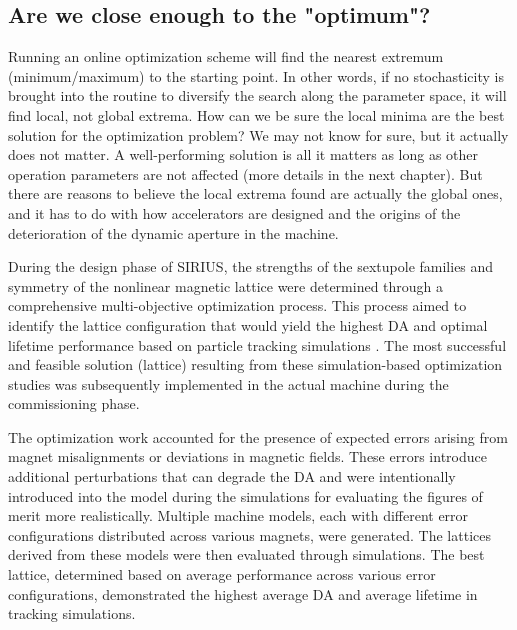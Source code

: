 \subsection{Are we close enough to the "optimum"?}
Running an online optimization scheme will find the nearest extremum (minimum/maximum) to the starting point. In other words, if no stochasticity is brought into the routine to diversify the search along the parameter space, it will find local, not global extrema. How can we be sure the local minima are the best solution for the optimization problem? We may not know for sure, but it actually does not matter. A well-performing solution is all it matters as long as other operation parameters are not affected (more details in the next chapter). But there are reasons to believe the local extrema found are actually the global ones, and it has to do with how accelerators are designed and the origins of the deterioration of the dynamic aperture in the machine.

During the design phase of SIRIUS, the strengths of the sextupole families and symmetry of the nonlinear magnetic lattice were determined through a comprehensive multi-objective optimization process. This process aimed to identify the lattice configuration that would yield the highest \gls*{DA} and optimal lifetime performance based on particle tracking simulations \cite{de_sa_optimization_2016}. The most successful and feasible solution (lattice) resulting from these simulation-based optimization studies was subsequently implemented in the actual machine during the commissioning phase.

The optimization work accounted for the presence of expected errors arising from magnet misalignments or deviations in magnetic fields. These errors introduce additional perturbations that can degrade the \gls*{DA} and were intentionally introduced into the model during the simulations for evaluating the figures of merit more realistically. Multiple machine models, each with different error configurations distributed across various magnets, were generated. The lattices derived from these models were then evaluated through simulations. The best lattice, determined based on average performance across various error configurations, demonstrated the highest average \gls*{DA} and average lifetime in tracking simulations.

